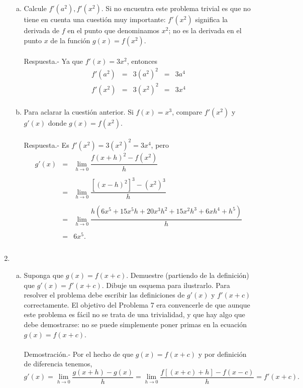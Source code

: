 \begin{enumerate}[\bfseries 1]
\begin{enumerate}[(a)]
	    \item Calcule $f'\left(a^2\right),f'\left(x^2\right)$. Si no encuentra este problema trivial es que no tiene en cuenta una cuestión muy importante: $f'(x^2)$ significa la derivada de $f$ en el punto que denominamos $x^2$; no es la derivada en el punto $x$ de la función $g(x)=f\left(x^2\right)$. \\\\
		Respuesta.- Ya que $f'(x)=3x^{2}$, entonces
		$$\begin{array}{rclcl}
		    f'\left(a^2\right)&=&3\left(a^2\right)^2&=&3a^4\\
		    f'\left(x^2\right)&=&3\left(x^2\right)^2&=&3x^4\\
		\end{array}$$

	    \item Para aclarar la cuestión anterior. Si $f(x)=x^3$, compare $f'\left(x^2\right)$ y $g'(x)$ donde $g(x)=f\left(x^2\right)$.\\\\
		Respuesta.-\; Es $f'\left(x^2\right) = 3\left(x^2\right)^2 =3x^4$, pero 
		$$\begin{array}{rcl}
		    g'(x)&=&\lim\limits_{h\to 0}\dfrac{f(x+h)^2-f\left(x^2\right)}{h}\\\\
			 &=&\lim\limits_{h\to 0}\dfrac{\left[(x-h)^2\right]^3-\left(x^2\right)^3}{h}\\\\
			 &=&\lim\limits_{h\to 0}\dfrac{h\left(6x^5+15x^5h+20x^3h^2+15x^2h^3+6xh^4+h^5\right)}{h}\\\\
			 &=&6x^5.\\\\
	    \end{array}$$

	\end{enumerate}

    \item 
	\begin{enumerate}[(a)]

	    \item Suponga que $g(x)=f(x+c).$ Demuestre (partiendo de la definición) que $g'(x)=f'(x+c)$. Dibuje un esquema para ilustrarlo. Para resolver el problema debe escribir las definiciones de $g'(x)$ y $f'(x+c)$ correctamente. El objetivo del Problema 7 era convencerle de que aunque este problema es fácil no se trata de una trivialidad, y que hay algo que debe demostrarse: no se puede simplemente poner primas en la ecuación $g(x) = f ( x + c)$.\\\\
		Demostración.-\; Por el hecho de que $g(x)=f(x+c)$ y por definición de diferencia tenemos, 
		$$g'(x) = \lim_{h\to 0}\dfrac{g(x+h)-g(x)}{h}=\lim_{h\to 0}\dfrac{f\left[(x+c)+h\right]-f(x-c)}{h} = f'(x+c).$$\\


\end{enumerate}
\end{enumerate}
